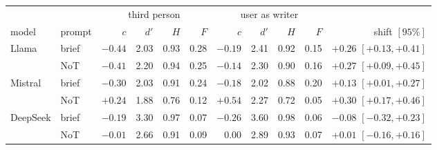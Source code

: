 {\footnotesize
\setlength{\tabcolsep}{4pt}\begin{tabular}{@{}llrrrrrrrrr@{}}
\toprule
 & & \multicolumn{4}{c}{third person} & \multicolumn{4}{c}{user as writer} & \\
\cmidrule(lr){3-6}\cmidrule(lr){7-10}
model & prompt & $c$ & $d'$ & $H$ & $F$ & $c$ & $d'$ & $H$ & $F$ & shift $[95\%]$ \\
\midrule
Llama & brief & $-0.44$ & 2.03 & 0.93 & 0.28 & $-0.19$ & 2.41 & 0.92 & 0.15 & $+0.26$ $[+0.13, +0.41]$ \\
 & NoT & $-0.41$ & 2.20 & 0.94 & 0.25 & $-0.14$ & 2.30 & 0.90 & 0.16 & $+0.27$ $[+0.09, +0.45]$ \\
\addlinespace
Mistral & brief & $-0.30$ & 2.03 & 0.91 & 0.24 & $-0.18$ & 2.02 & 0.88 & 0.20 & $+0.13$ $[+0.01, +0.27]$ \\
 & NoT & $+0.24$ & 1.88 & 0.76 & 0.12 & $+0.54$ & 2.27 & 0.72 & 0.05 & $+0.30$ $[+0.17, +0.46]$ \\
\addlinespace
DeepSeek & brief & $-0.19$ & 3.30 & 0.97 & 0.07 & $-0.26$ & 3.60 & 0.98 & 0.06 & $-0.08$ $[-0.32, +0.23]$ \\
 & NoT & $-0.01$ & 2.66 & 0.91 & 0.09 & $0.00$ & 2.89 & 0.93 & 0.07 & $+0.01$ $[-0.16, +0.16]$ \\
\bottomrule
\end{tabular}}
